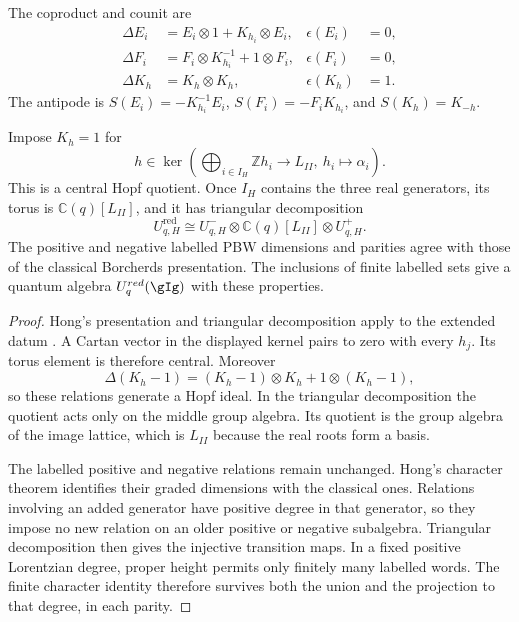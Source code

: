 The coproduct and counit are
\[
\begin{aligned}
 \Delta E_i&=E_i\otimes1+K_{h_i}\otimes E_i,
 &\epsilon(E_i)&=0,\\
 \Delta F_i&=F_i\otimes K_{h_i}^{-1}+1\otimes F_i,
 &\epsilon(F_i)&=0,\\
 \Delta K_h&=K_h\otimes K_h,
 &\epsilon(K_h)&=1.
\end{aligned}
\]
The antipode is \(S(E_i)=-K_{h_i}^{-1}E_i\),
\(S(F_i)=-F_iK_{h_i}\), and \(S(K_h)=K_{-h}\).

\begin{theorem}
Impose \(K_h=1\) for
\[
 h\in\ker\!\left(\bigoplus_{i\in I_H}\mathbb Zh_i
                 \longrightarrow L_{II},\ h_i\longmapsto\alpha_i\right).
\]
This is a central Hopf quotient. Once \(I_H\) contains the three
real generators, its torus is \(\mathbb C(q)[L_{II}]\), and it has
triangular decomposition
\[
 U_{q,H}^{\mathrm{red}}
 \cong U_{q,H}^-\otimes\mathbb C(q)[L_{II}]\otimes U_{q,H}^+.
\]
The positive and negative labelled PBW dimensions and parities agree
with those of the classical Borcherds presentation. The inclusions
of finite labelled sets give a quantum algebra
\(U_q^{\mathrm{red}}(\gIg)\) with these properties.
\end{theorem}
\begin{proof}
Hong's presentation and triangular decomposition apply to the
extended datum \cite[Propositions~2.2--2.3 and~3.1]{Hong98}.
A Cartan vector in the displayed kernel pairs to zero with every
\(h_j\). Its torus element is therefore central. Moreover
\[
 \Delta(K_h-1)=(K_h-1)\otimes K_h+1\otimes(K_h-1),
\]
so these relations generate a Hopf ideal. In the triangular
decomposition the quotient acts only on the middle group algebra.
Its quotient is the group algebra of the image lattice, which is
\(L_{II}\) because the real roots form a basis.

The labelled positive and negative relations remain unchanged.
Hong's character theorem identifies their graded dimensions with
the classical ones. Relations involving an added generator have
positive degree in that generator, so they impose no new relation
on an older positive or negative subalgebra. Triangular decomposition
then gives the injective transition maps. In a fixed positive
Lorentzian degree, proper height permits only finitely many labelled
words. The finite character identity therefore survives both the
union and the projection to that degree, in each parity.
\end{proof}

